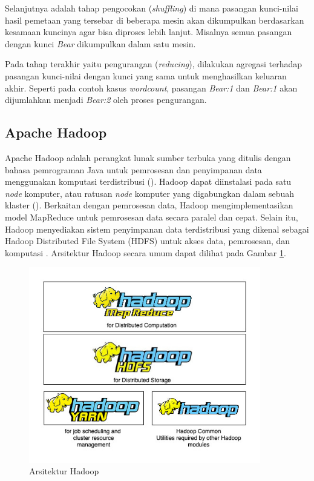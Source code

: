 Selanjutnya adalah tahap pengocokan (\textit{shuffling}) di mana pasangan kunci-nilai hasil pemetaan yang tersebar di beberapa mesin akan dikumpulkan berdasarkan kesamaan kuncinya agar bisa diproses lebih lanjut. Misalnya semua pasangan dengan kunci \textit{Bear} dikumpulkan dalam satu mesin.

Pada tahap terakhir yaitu pengurangan (\textit{reducing}), dilakukan agregasi terhadap pasangan kunci-nilai dengan kunci yang sama untuk menghasilkan keluaran akhir. Seperti pada contoh kasus \textit{wordcount}, pasangan \textit{Bear:1} dan \textit{Bear:1} akan dijumlahkan menjadi \textit{Bear:2} oleh proses pengurangan.

\subsection{Apache Hadoop}
Apache Hadoop adalah perangkat lunak sumber terbuka yang ditulis dengan bahasa pemrograman Java untuk pemrosesan dan penyimpanan data menggunakan komputasi terdistribusi (\cite{ApacheHadoop}). Hadoop dapat diinstalasi pada satu \textit{node} komputer, atau ratusan \textit{node} komputer yang digabungkan dalam sebuah klaster (\cite{maneasEvolutionHadoopDistributed2018}). Berkaitan dengan pemrosesan data, Hadoop mengimplementasikan model MapReduce untuk pemrosesan data secara paralel dan cepat. Selain itu, Hadoop menyediakan sistem penyimpanan data terdistribusi yang dikenal sebagai Hadoop Distributed File System (HDFS) untuk akses data, pemrosesan, dan komputasi \cite{dabasAnalysisCommentsYoutube2019}. Arsitektur Hadoop secara umum dapat dilihat pada Gambar \ref{fig:hadoop-str}.

\begin{figure}[h!]
    \centering
    \includegraphics[width=0.9\textwidth]{figures/ch02/hadoop-str}
    \caption{Arsitektur Hadoop}
    \label{fig:hadoop-str}
\end{figure}



